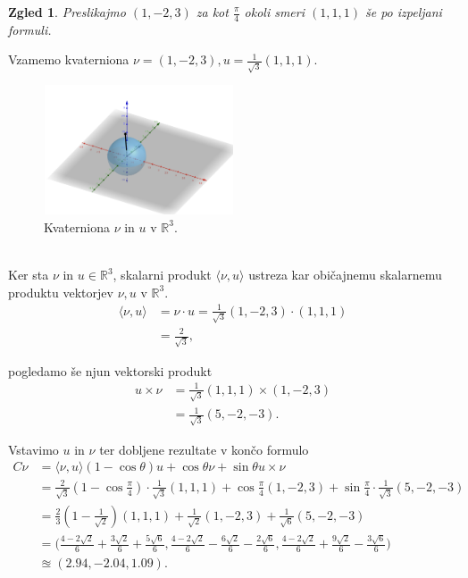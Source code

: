 \documentclass[a4paper,12pt]{article}
\def\R{\mathbb{R}} %
\newcommand{\dotpr}[2]{\langle #1, #2 \rangle}
\newtheorem{zgled}{Zgled}
\begin{document}
\begin{zgled}
   Preslikajmo $(1, -2, 3)$ za kot $\frac{\pi}{4}$ okoli smeri $(1,1,1)$ še po izpeljani formuli.
\end{zgled}
Vzamemo kvaterniona $\nu = (1, -2, 3), u = \frac{1}{\sqrt{3}}(1,1,1)$.
\begin{figure}[ht]
   \centering
   \includegraphics[width = 0.5\textwidth]{vektorji_u_nu}
   \caption{Kvaterniona $\nu$ in $u$ v $\R^3$.}
\end{figure}\\
Ker sta $\nu$ in $u \in \R^3$, skalarni produkt $\dotpr{\nu}{u}$ ustreza kar običajnemu skalarnemu produktu vektorjev $\nu, u$ v $\R^3$.
\begin{align*}
   \dotpr{\nu}{u} &= \nu \cdot u = \frac{1}{\sqrt{3}} (1, -2, 3) \cdot (1,1,1)\\
                  &= \frac{2}{\sqrt{3}},
\end{align*}

\noindent pogledamo še njun vektorski produkt
\begin{align*}
   u \times \nu &= \frac{1}{\sqrt{3}}(1,1,1)\times(1,-2,3)\\
                &= \frac{1}{\sqrt{3}}(5,-2,-3).
\end{align*}

Vstavimo $u$ in $\nu$ ter dobljene rezultate v končo formulo
\begin{align*}
   C\nu &= \dotpr{\nu}{u}(1 - \cos\theta)u + \cos\theta \nu + \sin\theta u\times\nu\\
        &= \frac{2}{\sqrt{3}}(1 - \cos\frac{\pi}{4}) \cdot \frac{1}{\sqrt{3}}(1,1,1) + \cos\frac{\pi}{4}(1,-2,3) + \sin\frac{\pi}{4} \cdot \frac{1}{\sqrt{3}}(5,-2,-3)\\
        &= \frac{2}{3}(1 - \frac{1}{\sqrt{2}})(1,1,1) + \frac{1}{\sqrt{2}}(1,-2,3) + \frac{1}{\sqrt{6}}(5,-2,-3)\\
        &= \big( \frac{4-2\sqrt{2}}{6} + \frac{3\sqrt{2}}{6} + \frac{5\sqrt{6}}{6},\frac{4-2\sqrt{2}}{6} - \frac{6\sqrt{2}}{6} - \frac{2\sqrt{6}}{6}, \frac{4-2\sqrt{2}}{6} + \frac{9\sqrt{2}}{6} - \frac{3\sqrt{6}}{6}\big)\\
        &\approxeq (2.94, -2.04, 1.09).
\end{align*}
\end{document}
